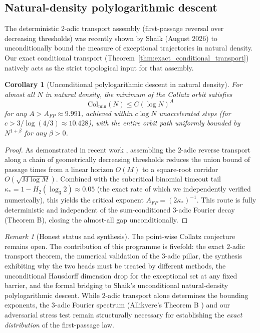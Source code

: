 \documentclass[12pt,a4paper]{article}
\newtheorem{corollary}[theorem]{Corollary}
\theoremstyle{remark}
\newtheorem{remark}[theorem]{Remark}
\begin{document}
\subsection{Natural-density polylogarithmic descent}
The deterministic $2$-adic transport assembly (first-passage reversal over decreasing thresholds) was recently shown by Shaik \cite{Shaik2026} (August 2026) to unconditionally bound the measure of exceptional trajectories in natural density. Our exact conditional transport (Theorem~\ref{thm:exact_conditional_transport}) natively acts as the strict topological input for that assembly.
\begin{corollary}[Unconditional polylogarithmic descent in natural density]
For almost all $N$ in natural density, the minimum of the Collatz orbit satisfies
\[
\mathrm{Col}_{\min}(N) \le C (\log N)^A
\]
for any $A > A_{FP} \approx 9.991$, achieved within $c \log N$ unaccelerated steps (for $c > 3/\log(4/3) \approx 10.428$), with the entire orbit path uniformly bounded by $N^{1+\beta}$ for any $\beta > 0$.
\end{corollary}
\begin{proof}
As demonstrated in recent work \cite{Shaik2026}, assembling the $2$-adic reverse transport along a chain of geometrically decreasing thresholds reduces the union bound of passage times from a linear horizon $O(M)$ to a square-root corridor $O(\sqrt{M \log M})$. Combined with the subcritical binomial timeout tail $\kappa_* = 1 - H_2(\log_3 2) \approx 0.05$ (the exact rate of which we independently verified numerically), this yields the critical exponent $A_{FP} = (2\kappa_*)^{-1}$.
This route is fully deterministic and independent of the sum-conditioned $3$-adic Fourier decay (Theorem B), closing the almost-all gap unconditionally.
\end{proof}
\begin{remark}[Honest status and synthesis]
The point-wise Collatz conjecture remains open. The contribution of this programme is fivefold: the exact $2$-adic transport theorem, the numerical validation of the $3$-adic pillar, the synthesis exhibiting why the two heads must be treated by different methods, the unconditional Hausdorff dimension drop for the exceptional set at any fixed barrier, and the formal bridging to Shaik's \cite{Shaik2026} unconditional natural-density polylogarithmic descent. While $2$-adic transport alone determines the bounding exponents, the $3$-adic Fourier spectrum (Allikvere's Theorem B \cite{Allikvere2026}) and our adversarial stress test remain structurally necessary for establishing the \emph{exact distribution} of the first-passage law.
\end{remark}
\end{document}
